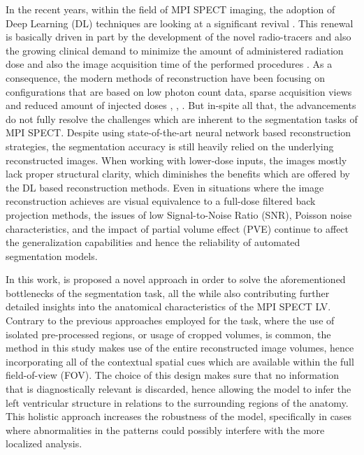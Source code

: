 In the recent years, within the field of MPI SPECT imaging, the adoption of Deep Learning (DL) techniques are looking at a significant revival \cite{tolu2025advancements}. This renewal is basically driven in part by the development of the novel radio-tracers and also the growing clinical demand to minimize the amount of administered radiation dose and also the image acquisition time of the performed procedures \cite{henzlova2011future}. As a consequence, the modern methods of reconstruction have been focusing on configurations that are based on low photon count data, sparse acquisition views and reduced amount of injected doses \cite{xie2023transformer}, \cite{xie2024generalizable}, \cite{chen2024dudocfnet}. But in-spite all that, the advancements do not fully resolve the challenges which are inherent to the segmentation tasks of MPI SPECT. Despite using state-of-the-art neural network based reconstruction strategies, the segmentation accuracy is still heavily relied on the underlying reconstructed images. When working with lower-dose inputs, the images mostly lack proper structural clarity, which diminishes the benefits which are offered by the DL based reconstruction methods. Even in situations where the image reconstruction achieves are visual equivalence to a full-dose filtered back projection methods, the issues of low Signal-to-Noise Ratio (SNR), Poisson noise characteristics, and the impact of partial volume effect (PVE) continue to affect the generalization capabilities and hence the reliability of automated segmentation models.

In this work, is proposed a novel approach in order to solve the aforementioned bottlenecks of the segmentation task, all the while also contributing further detailed insights into the anatomical characteristics of the MPI SPECT LV. Contrary to the previous approaches employed for the task, where the use of isolated pre-processed regions, or usage of cropped volumes, is common, the method in this study makes use of the entire reconstructed image volumes, hence incorporating all of the contextual spatial cues which are available within the full field-of-view (FOV). The choice of this design makes sure that no information that is diagnostically relevant is discarded, hence allowing the model to infer the left ventricular structure in relations to the surrounding regions of the anatomy. This holistic approach increases the robustness of the model, specifically in cases where abnormalities in the patterns could possibly interfere with the more localized analysis.

